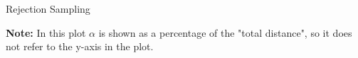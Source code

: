 \documentclass[11pt,compress,t,notes=noshow, xcolor=table]{beamer}
\begin{document}
\begin{vbframe}{Rejection Sampling}

\vspace*{-0.3cm}
\begin{footnotesize}
\textbf{Note:} In this plot $\alpha$ is shown as a percentage of the "total distance", so it does not refer to the y-axis in the plot.
\end{footnotesize}

\framebreak

\begin{algorithm}[H]
  \caption{Rejection Sampling}
  \begin{algorithmic}[1]
    \Else
    \EndIf
  \EndWhile
  \end{algorithmic}
\end{algorithm}

\end{vbframe}
\end{document}
